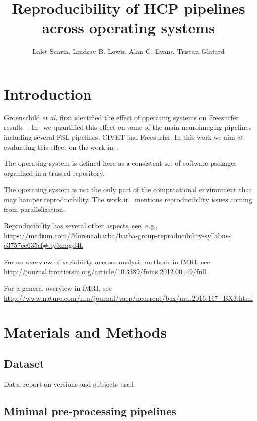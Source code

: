 \documentclass{article}
\title{Reproducibility of HCP pipelines across operating systems}
\author{Lalet Scaria, Lindsay B. Lewis, Alan C. Evans, Tristan Glatard}
\begin{document}
\maketitle


\section{Introduction}

Groenschild \emph{et al.} first identified the effect of operating
systems on Freesurfer
results~\cite{Gronenschild2012}. In~\cite{10.3389/fninf.2015.00012} we
quantified this effect on some of the main neuroimaging pipelines
including several FSL pipelines, CIVET and Freesurfer. In this work we
aim at evaluating this effect on the work in~\cite{glasser2015multi}.

The operating system is defined here as a consistent set of software
packages organized in a trusted repository.

The operating system is not the only part of the computational
environment that may hamper reproducibility. The work
in~\cite{diethelm2012limits} mentions reproducibility issues coming
from parallelization.

Reproducibility has several other aspects, see, e.g.,
\url{https://medium.com/@lorenaabarba/barba-group-reproducibility-syllabus-e3757ee635cf#.ty3zmgd4k}

For an overview of variability accross analysis methods in fMRI, see \url{http://journal.frontiersin.org/article/10.3389/fnins.2012.00149/full}.

For a general overview in fMRI, see \url{http://www.nature.com/nrn/journal/vaop/ncurrent/box/nrn.2016.167_BX3.html}

\section{Materials and Methods}

\subsection{Dataset}

Data: report on versions and subjects used.

\subsection{Minimal pre-processing pipelines}
\end{document}
